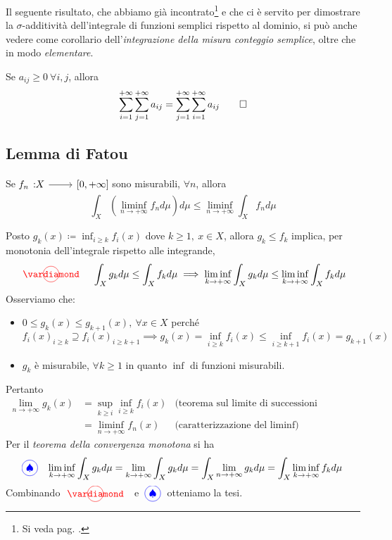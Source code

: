 Il seguente risultato, che abbiamo già incontrato\footnote{Si veda pag. \pageref{commutativitàindici}.} e che ci è servito per dimostrare la $\sigma$-additività dell'integrale di funzioni semplici rispetto al dominio, si può anche vedere come corollario dell'\textit{integrazione della misura conteggio semplice}, oltre che in modo \textit{elementare}. 
\begin{corollaryqed}
	Se $a_{ij}\geq0\ \forall i,j$, allora
	\begin{equation*}
		\sum_{i=1}^{+\infty}\sum_{j=1}^{+\infty}a_{ij}=\sum_{j=1}^{+\infty}\sum_{i=1}^{+\infty}a_{ij}\qedhere
	\end{equation*}
\end{corollaryqed}
\subsection{Lemma di Fatou}
\begin{lemming}
	Se $\funz{f_n}{X}{\left[0,+\infty\right]}$ sono misurabili, $\forall n$, allora
	\begin{equation}
		\int_X\left(\liminf_{n\to+\infty}f_nd\mu\right)d\mu\leq \liminf_{n\to+\infty}\int_Xf_nd\mu
	\end{equation}
\end{lemming}
\begin{demonstration}
	Posto $\displaystyle g_k(x)\coloneqq\inf_{i\geq k}f_i(x)$ dove $k\geq 1,\ x\in X$, allora $g_k\leq f_k$ implica, per monotonia dell'integrale rispetto alle integrande,
	\begin{equation*}
		\circled[red]{\vardiamond}\quad\int_Xg_kd\mu\leq \int_Xf_kd\mu\implies \liminf_{k\to+\infty}\int_Xg_kd\mu\leq \liminf_{k\to+\infty}\int_Xf_kd\mu
	\end{equation*}
Osserviamo che:
\begin{itemize}
	\item $0\leq g_k(x)\leq g_{k+1}(x),\ \forall x\in X$ perché
	\begin{equation*}
		f_i(x)_{i\geq k}\supseteq f_i(x)_{i\geq k+1}\implies g_k(x)=\inf_{i\geq k}f_i(x)\leq\inf_{i\geq k+1}f_i(x)=g_{k+1}(x)
	\end{equation*}
	\item $g_k$ è misurabile, $\forall k\geq 1$ in quanto $\inf$ di funzioni misurabili.
\end{itemize}
Pertanto
	\begin{align*}
	\lim_{n\to+\infty}g_k(x)&=\sup_{k\geq i}\inf_{i\geq k}f_i(x)&\text{(teorema sul limite di successioni monotone)}\\
	&=\liminf_{n\to+\infty}f_n(x)&\text{(caratterizzazione del $\liminf$)}
\end{align*}
Per il \textit{teorema della convergenza monotona} si ha
\begin{equation*}
	\circled[blue]{\spadesuit}\quad \liminf_{k\to+\infty}\int_Xg_kd\mu=\lim_{k\to+\infty}\int_Xg_kd\mu=\int_X\lim_{n\to+\infty}g_kd\mu=\int_X\liminf_{k\to+\infty}f_kd\mu
\end{equation*}
Combinando $\circled[red]{\vardiamond}\ $ e $\ \circled[blue]{\spadesuit}\ $ otteniamo la tesi.
\end{demonstration}
